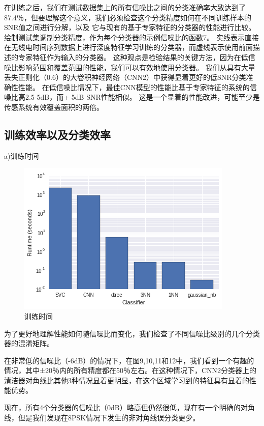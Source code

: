 在训练之后，我们在测试数据集上的所有信噪比之间的分类准确率大致达到了87.4％，但要理解这个意义，我们必须检查这个分类精度如何在不同训练样本的SNR值之间进行分解，以及 它与现有的基于专家特征的分类器的性能进行比较。绘制测试集调制分类精度，作为每个分类器的示例信噪比的函数7。 实线表示直接在无线电时间序列数据上进行深度特征学习训练的分类器，而虚线表示使用前面描述的专家特征作为输入的分类器。 这种观点是检验结果的关键方法，因为在低信噪比影响范围和覆盖范围的性能，我们可以有效地使用分类器。 我们从具有大量丢失正则化（0.6）的大卷积神经网络（CNN2）中获得显着更好的低SNR分类准确性性能。 在低信噪比情况下，最佳CNN模型的性能比基于专家特征的系统的信噪比高2.5-5dB，而+ 5dB SNR性能相似。 这是一个显着的性能改进，可能至少是传感系统有效覆盖面积的两倍。\par


\subsection{训练效率以及分类效率}

a)训练时间
\begin{figure}[!h]
	\centering
	\includegraphics[scale=0.6]{figures/chapter_3/fig_3_12}
	\caption{训练时间}	\label{sec:fig_3_12}
\end{figure}

为了更好地理解性能如何随信噪比而变化，我们检查了不同信噪比级别的几个分类器的混淆矩阵。\par

在非常低的信噪比（-6dB）的情况下，在图9,10,11和12中，我们看到一个有趣的情况，其中±20％内的所有精度都在50％左右。在这种情况下，CNN2分类器上的清洁器对角线比其他3种情况显着更明显，在这个区域学习到的特征具有显着的性能优势。\par

现在，所有4个分类器的信噪比（0dB）略高但仍然很低，现在有一个明确的对角线，但是我们发现在8PSK情况下发生的非对角线误分类更少。\par

